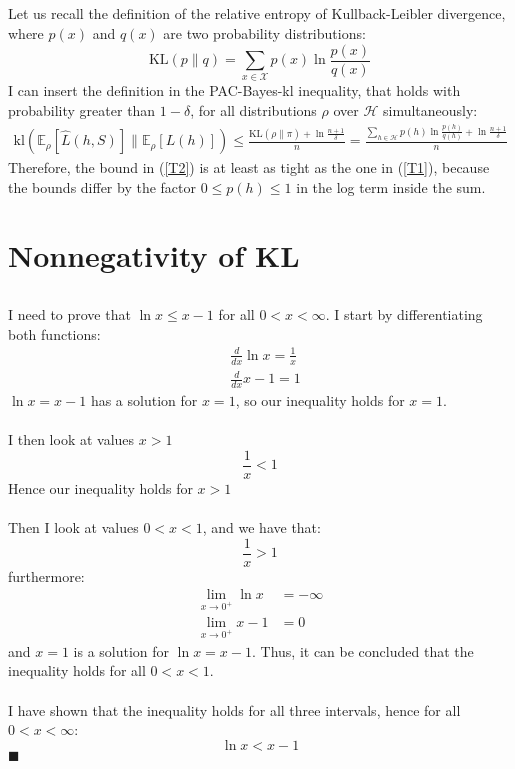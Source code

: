 \documentclass[a4paper]{article}
\newcommand*{\QEDA}{\hfill\ensuremath{\blacksquare}}%
\begin{document}
\subsection{}
\label{subsec:32}
Let us recall the definition of the relative entropy of Kullback-Leibler
divergence, where $p(x)$ and $q(x)$ are two probability distributions:
\[
\mathrm{KL}(p \| q)=
\sum_{x \in \mathcal{X}} p(x) \ln \frac{p(x)}{q(x)}
\]
I can insert the definition in the PAC-Bayes-kl inequality, that holds with probability greater
than $1-\delta$, for all distributions $\rho$ over $\mathcal{H}$ simultaneously:
\begin{align}
  \label{T2}
\mathrm{kl}\left(\mathbb{E}_{\rho}[\hat{L}(h, S)] \|
\mathbb{E}_{\rho}[L(h)]\right)
\leq \frac{\mathrm{KL}(\rho \| \pi)+\ln \frac{n+1}{\delta}}{n}
=\frac{\sum_{h \in \mathcal{H}} p(h) \ln \frac{p(h)}{q(h)}+\ln \frac{n+1}{\delta}}{n}
\end{align}
Therefore, the bound in (\ref{T2}) is at least as tight as the one in (\ref{T1}),
because the bounds differ by the factor $0 \leq p(h) \leq 1$ in the log
term inside the sum.
\newpage

\section{Nonnegativity of KL}
\label{sec:4}
\subsection{}
\label{subsec:41}
I need to prove that $\ln x \leq x-1$ for all $0<x<\infty$. I start by
differentiating both functions:
\begin{align*}
&\frac{d}{dx}\ln x = \frac{1}{x} \\
&\frac{d}{dx}x-1 = 1 
\end{align*}
$\ln x = x - 1$ has a solution for $x=1$, so our inequality holds for $x=1$.\\\\
I then look at values $x>1$
\[
\frac{1}{x} < 1 
\]
Hence our inequality holds for $x>1$\\\\
Then I look at values $0 < x < 1$, and we have that:
\[
\frac{1}{x} > 1
\]
furthermore:
\begin{align*}
\lim _{x \rightarrow 0^{+}} \ln{x} &= -\infty \\
\lim _{x \rightarrow 0^{+}} x-1 &= 0
\end{align*}
and $x=1$ is a solution for $\ln x = x - 1$.
Thus, it can be concluded that the inequality holds for all $0<x<1$.\\\\
I have shown that the inequality holds for all three intervals, hence for all $0<x<\infty$:
\[
\ln x < x - 1
\]
\QEDA
\end{document}
